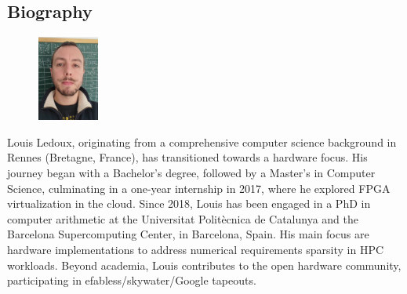 \subsection{Biography}
\label{sec:biography}

\begin{figure} %
\centering
\includegraphics[width=0.18\textwidth]{./figures/louis2.jpg}
\end{figure}
Louis Ledoux, originating from a comprehensive computer science background in Rennes (Bretagne, France), has transitioned towards a hardware focus. His journey began with a Bachelor's degree, followed by a Master's in Computer Science, culminating in a one-year internship in 2017, where he explored FPGA virtualization in the cloud. Since 2018, Louis has been engaged in a PhD in computer arithmetic at the Universitat Polit\`ecnica de Catalunya and the Barcelona Supercomputing Center, in Barcelona, Spain. His main focus are hardware implementations to address numerical requirements sparsity in HPC workloads. Beyond academia, Louis contributes to the open hardware community, participating in efabless/skywater/Google tapeouts.

